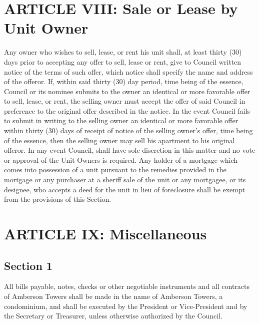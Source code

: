 \documentclass[
]{book}
\begin{document}
\hypertarget{article-viii-sale-or-lease-by-unit-owner}{%
\section*{ARTICLE VIII: Sale or Lease by Unit Owner}\label{article-viii-sale-or-lease-by-unit-owner}}

Any owner who wishes to sell, lease, or rent his unit shall, at least thirty (30) days prior to accepting any offer to sell, lease or rent, give to Council written notice of the terms of such offer, which notice shall specify the name and address of the offeror. If, within said thirty (30) day period, time being of the essence, Council or its nominee submits to the owner an identical or more favorable offer to sell, lease, or rent, the selling owner must accept the offer of said Council in preference to the original offer described in the notice. In the event Council fails to submit in writing to the selling owner an identical or more favorable offer within thirty (30) days of receipt of notice of the selling owner's offer, time being of the essence, then the selling owner may sell his apartment to his original offeror. In any event Council, shall have sole discretion in this matter and no vote or approval of the Unit Owners is required. Any holder of a mortgage which comes into possession of a unit pursuant to the remedies provided in the mortgage or any purchaser at a sheriff sale of the unit or any mortgagee, or its designee, who accepts a deed for the unit in lieu of foreclosure shall be exempt from the provisions of this Section.

\hypertarget{article-ix-miscellaneous}{%
\section*{ARTICLE IX: Miscellaneous}\label{article-ix-miscellaneous}}

\hypertarget{section-1-7}{%
\subsection*{Section 1}\label{section-1-7}}

All bills payable, notes, checks or other negotiable instruments and all contracts of Amberson Towers shall be made in the name of Amberson Towers, a condominium, and shall be executed by the President or Vice-President and by the Secretary or Treasurer, unless otherwise authorized by the Council.
\end{document}
